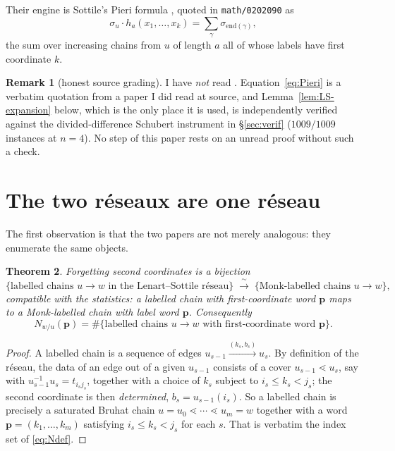 \documentclass[11pt]{article}
\theoremstyle{plain}
\newtheorem{theorem}{Theorem}[section]
\theoremstyle{definition}
\newtheorem{remark}[theorem]{Remark}
\newcommand{\pv}{\mathbf{p}}
\begin{document}
Their engine is Sottile's Pieri formula \cite[eq.~(7)]{So96}, quoted in
\texttt{math/0202090} as
\begin{equation}\label{eq:Pieri}
  \sigma_u\cdot h_a(x_1,\dots,x_k)=\sum_\gamma \sigma_{\mathrm{end}(\gamma)},
\end{equation}
the sum over increasing chains from $u$ of length $a$ all of whose labels have
first coordinate $k$.

\begin{remark}[honest source grading]
I have \emph{not} read \cite{So96}. Equation~\eqref{eq:Pieri} is a verbatim
quotation from a paper I did read at source, and
Lemma~\ref{lem:LS-expansion} below, which is the only place it is used, is
independently verified against the divided-difference Schubert instrument in
\S\ref{sec:verif} ($1009/1009$ instances at $n=4$). No step of this paper rests
on an unread proof without such a check.
\end{remark}

\section{The two r\'eseaux are one r\'eseau}

The first observation is that the two papers are not merely analogous: they
enumerate the same objects.

\begin{theorem}\label{thm:same-objects}
Forgetting second coordinates is a bijection
\[
  \bigl\{\text{labelled chains }u\to w\text{ in the Lenart--Sottile r\'eseau}\bigr\}
  \;\xrightarrow{\ \sim\ }\;
  \bigl\{\text{Monk-labelled chains }u\to w\bigr\},
\]
compatible with the statistics: a labelled chain with first-coordinate word
$\pv$ maps to a Monk-labelled chain with label word $\pv$. Consequently
\[
  N_{w/u}(\pv)=\#\{\text{labelled chains }u\to w\text{ with first-coordinate word }\pv\}.
\]
\end{theorem}

\begin{proof}
A labelled chain is a sequence of edges
$u_{s-1}\xrightarrow{(k_s,b_s)}u_s$. By definition of the r\'eseau, the data of
an edge out of a given $u_{s-1}$ consists of a cover $u_{s-1}\lessdot u_s$, say
with $u_{s-1}^{-1}u_s=t_{i_sj_s}$, together with a choice of $k_s$ subject to
$i_s\le k_s<j_s$; the second coordinate is then \emph{determined},
$b_s=u_{s-1}(i_s)$. So a labelled chain is precisely a saturated Bruhat chain
$u=u_0\lessdot\cdots\lessdot u_m=w$ together with a word $\pv=(k_1,\dots,k_m)$
satisfying $i_s\le k_s<j_s$ for each $s$. That is verbatim the index set
of \eqref{eq:Ndef}.
\end{proof}
\end{document}
